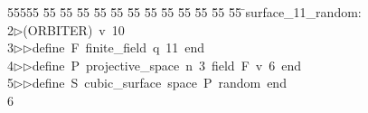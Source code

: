 %
%
\begin{tabbing}
55555 \= 55 \= 55 \= 55 \= 55 \= 55 \= 55 \= 55 \= 55 \= 55 \= 55 \= 55 \= 55 \= \>surface\_11\_random:\\[0pt]
2\>$\triangleright$\>(ORBITER)\ v\ 10\ \\[0pt]
3\>$\triangleright$\>$\triangleright$\>define\ F\ finite\_field\ q\ 11\ end\ \\[0pt]
4\>$\triangleright$\>$\triangleright$\>define\ P\ projective\_space\ n\ 3\ field\ F\ v\ 6\ end\ \\[0pt]
5\>$\triangleright$\>$\triangleright$\>define\ S\ cubic\_surface\ space\ P\ random\ end\\[0pt]
6\>\end{tabbing}
